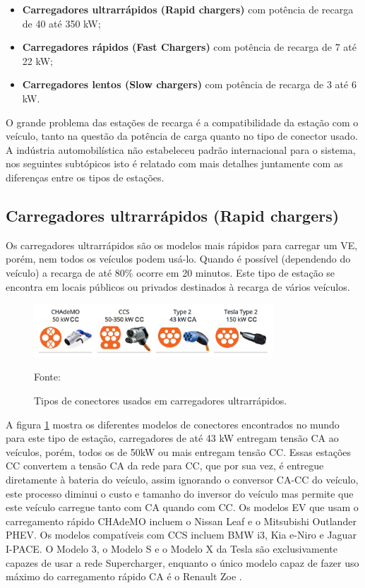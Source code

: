 \begin{itemize}
  \item \textbf{Carregadores ultrarrápidos (Rapid chargers)} com potência de recarga de 40 até 350 kW;
  
  \item \textbf{Carregadores rápidos (Fast Chargers)} com potência de recarga de 7 até 22 kW;
  
  \item \textbf{Carregadores lentos (Slow chargers)} com potência de recarga de 3 até 6 kW.
\end{itemize}

O grande problema das estações de recarga é a compatibilidade da estação com o veículo, tanto na questão da potência de carga quanto no tipo de conector usado. A indústria automobilística não estabeleceu padrão internacional para o sistema, nos seguintes subtópicos isto é relatado com mais detalhes juntamente com as diferenças entre os tipos de estações.

\subsection{Carregadores ultrarrápidos (Rapid chargers)}

Os carregadores ultrarrápidos são os modelos mais rápidos para carregar um VE, porém, nem todos os veículos podem usá-lo. Quando é possível (dependendo do veículo) a recarga de até 80\% ocorre em 20 minutos. Este tipo de estação se encontra em locais públicos ou privados destinados à recarga de vários veículos.

\begin{figure}[H]
    \centering
    \includegraphics[width=0.8\textwidth]{./Figuras/rapid_chargers.png}
    \caption{Tipos de conectores usados em carregadores ultrarrápidos.}{Fonte: \cite{ev_conect_zap}}
   \label{fig:rapid_chargers}
\end{figure}

A figura \ref{fig:rapid_chargers} mostra os diferentes modelos de conectores encontrados no mundo para este tipo de estação, carregadores de até 43 kW entregam tensão CA ao veículos, porém, todos os de 50kW ou mais entregam tensão CC. Essas estações CC convertem a tensão CA da rede para CC, que por sua vez, é entregue diretamente à bateria do veículo, assim ignorando o conversor CA-CC do veículo, este processo diminui o custo e tamanho do inversor do veículo mas permite que este veículo carregue tanto com CA quando com CC. Os modelos EV que usam o carregamento rápido CHAdeMO incluem o Nissan Leaf e o Mitsubishi Outlander PHEV. Os modelos compatíveis com CCS incluem BMW i3, Kia e-Niro e Jaguar I-PACE. O Modelo 3, o Modelo S e o Modelo X da Tesla são exclusivamente capazes de usar a rede Supercharger, enquanto o único modelo capaz de fazer uso máximo do carregamento rápido CA é o Renault Zoe \cite{ev_conect_zap}.

